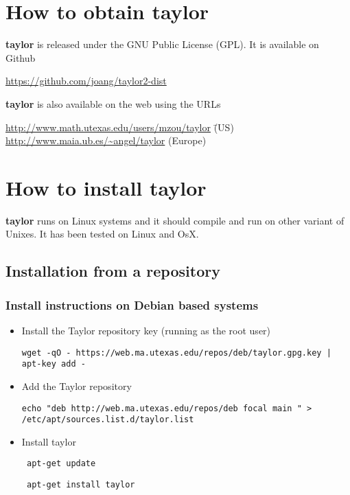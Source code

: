 \documentclass[10pt]{article}
\theoremstyle{remark}
\newcommand{\taylorname}{{\bf taylor}}
\begin{document}
\section{How to obtain \taylorname{}} \label{sec:download}
\taylorname{} is released under the GNU Public License (GPL).  It is
available on Github
\begin{tabbing}
    \url{https://github.com/joang/taylor2-dist}
\end{tabbing}
\taylorname{} is also available on the web using the URLs
\begin{tabbing}
    \url{http://www.math.utexas.edu/users/mzou/taylor}\hspace*{5mm} \= (US)\\
    \url{http://www.maia.ub.es/~angel/taylor} \> (Europe)
\end{tabbing}



\section{How to install \taylorname{}} \label{sec:install}
\taylorname{} runs on Linux systems and it should compile and run on
other variant of Unixes. It has been tested on Linux and OsX.

\subsection{Installation from a repository}
\subsubsection*{Install instructions on Debian based systems}
\begin{itemize}
    \item {Install the Taylor repository key (running as the root
      user)
    
    
    \tt{wget -qO - https://web.ma.utexas.edu/repos/deb/taylor.gpg.key
      | apt-key add - }}
    \item{Add the Taylor repository 

    
    \tt{echo "deb http://web.ma.utexas.edu/repos/deb focal main " >
      /etc/apt/sources.list.d/taylor.list }}
    \item{Install taylor 

    
    \tt{ apt-get update} 

    
    \tt{ apt-get install taylor}}
\end{itemize}
\end{document}
